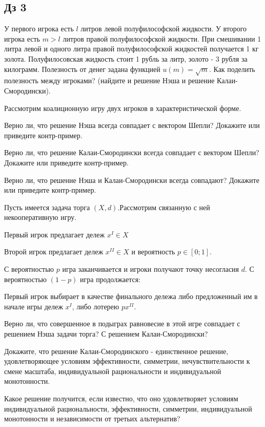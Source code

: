 \subsection{Дз 3}

\vspace{5pt} 
 У первого игрока есть $l$ литров левой полуфилософской
жидкости. У второго игрока есть $m>l$ литров правой полуфилософской
жидкости. При смешивании 1 литра левой и одного литра правой полуфилософской
жидкостей получается 1 кг золота. Полуфилосовская жидкость стоит 1
рубль за литр, золото - 3 рубля за килограмм. Полезность от денег
задана функцией $u(m)=\sqrt{m}$. Как поделить полезность между игроками?
(найдите и решение Нэша и решение Калаи-Смородински).

\vspace{5pt} 
 Рассмотрим коалиционную игру двух игроков в характеристической
форме.

Верно ли, что решение Нэша всегда совпадает с вектором Шепли? Докажите
или приведите контр-пример.

Верно ли, что решение Калаи-Смородински всегда совпадает с вектором
Шепли? Докажите или приведите контр-пример.

Верно ли, что решение Нэша и Калаи-Смородински всегда совпадают? Докажите
или приведите контр-пример.

\vspace{5pt} 
 Пусть имеется задача торга $(X,d).$Рассмотрим связанную
с ней некооперативную игру.

Первый игрок предлагает дележ $x^{I}\in X$

Второй игрок предлагает дележ $x^{II}\in X$ и вероятность $p\in[0;1]$.

С вероятностью $p$ игра заканчивается и игроки получают точку несогласия
$d$. С вероятностью $(1-p)$ игра продолжается:

Первый игрок выбирает в качестве финального дележа либо предложенный
им в начале игры дележ $x^{I}$, либо лотерею $px^{II}$. 

Верно ли, что совершенное в подыграх равновесие в этой игре совпадает
с решением Нэша задачи торга? С решением Калаи-Смородински?

\vspace{5pt}  Докажите, что решение Калаи-Смородинского - единственное
решение, удовлетворяющее условиям эффективности, симметрии, нечувствительности
к смене масштаба, индивидуальной рациональности и индивидуальной монотонности. 

\vspace{5pt}  Какое решение получится, если известно, что оно удовлетворяет
условиям индивидуальной рациональности, эффективности, симметрии,
индивидуальной монотонности и независимости от третьих альтернатив?